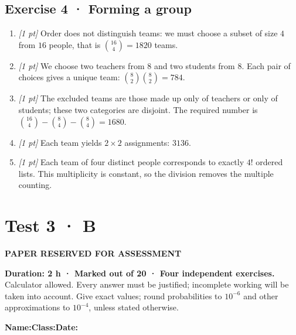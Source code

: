 \subsection*{Exercise 4 · Forming a group}\begin{enumerate}

\item \textit{[1 pt]} Order does not distinguish teams: we must choose a subset of size $4$ from $16$ people, that is $\binom{16}4=1820$ teams.

\item \textit{[1 pt]} We choose two teachers from $8$ and two students from $8$. Each pair of choices gives a unique team: $\binom{8}2\binom{8}2=784$.

\item \textit{[1 pt]} The excluded teams are those made up only of teachers or only of students; these two categories are disjoint. The required number is $\binom{16}4-\binom{8}4-\binom{8}4=1680$.

\item \textit{[1 pt]} Each team yields $2\times2$ assignments: $3136$.

\item \textit{[1 pt]} Each team of four distinct people corresponds to exactly $4!$ ordered lists. This multiplicity is constant, so the division removes the multiple counting.

\end{enumerate}

\fi

\fi

\ifprof

\clearpage{}\label{sujet:4-4}

\section*{Test 3 · B}

{\sffamily\bfseries\color{amber}PAPER RESERVED FOR ASSESSMENT\par}

\textbf{Duration: 2 h · Marked out of 20 · Four independent exercises.}\\Calculator allowed. Every answer must be justified; incomplete working will be taken into account. Give exact values; round probabilities to $10^{-6}$ and other approximations to $10^{-4}$, unless stated otherwise.

\smallskip\textbf{Name:}\enspace\dotfill\quad\textbf{Class:}\enspace\dotfill\quad\textbf{Date:}\enspace\dotfill

